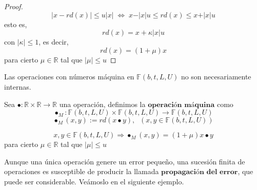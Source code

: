 \begin{proof}
\[ \vert x - rd(x) \vert \leq u \vert x \vert \; \Leftrightarrow \; x - \vert x \vert u \leq rd(x) \leq x + \vert x \vert u \]
esto es,
\[ rd(x) = x +\kappa \vert x \vert u \]
con $\vert \kappa \vert \leq 1$, es decir,
\[ rd(x) = (1 + \mu )x \]
para cierto $\mu \in \mathbb{R}$ tal que $\vert \mu \vert \leq u$
\end{proof}

Las operaciones con números máquina en $\mathbb{F} (b,t,L,U)$ no son necesariamente internas.

\begin{ndef}
Sea $ \bullet : \mathbb{R} \times \mathbb{R} \rightarrow \mathbb{R}$ una operación, definimos la $\textbf{operación máquina}$ como
\[ \bullet _M : \mathbb{F} (b,t,L,U) \times \mathbb{F} (b,t,L,U) \rightarrow \mathbb{F} (b,t,L,U) \]
\[ \bullet _M (x,y) := rd(x \bullet y), \; \; (x,y \in \mathbb{F} (b,t,L,U)) \]
\end{ndef}

\begin{ncor}
\[ x,y \in \mathbb{F} (b,t,L,U) \Rightarrow \bullet _M (x,y) = (1 + \mu ) x \bullet y \]
para cierto $\mu \in \mathbb{R}$ tal que $\vert \mu \vert \leq u$
\end{ncor}

Aunque una única operación genere un error pequeño, una sucesión finita de operaciones es susceptible de producir la llamada $\textbf{propagación del error}$, que puede ser considerable. Veámoslo en el siguiente ejemplo.

